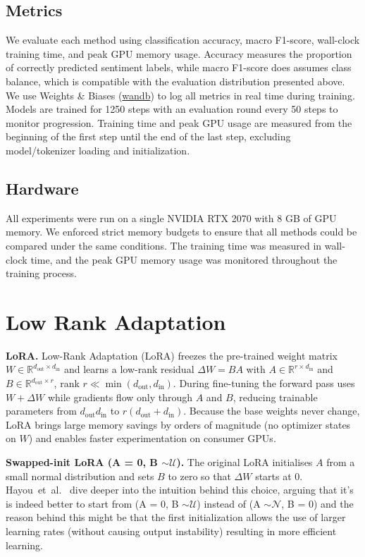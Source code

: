 \documentclass[a4paper,10pt,twocolumn,english]{article}
\begin{document}
\subsection{Metrics}
We evaluate each method using classification accuracy, macro F1-score, wall-clock training time, and peak GPU memory usage. Accuracy measures the proportion of correctly predicted sentiment labels, while macro F1-score does assumes class balance, which is compatible with the evaluation distribution presented above. We use Weights \& Biases (\href{https://wandb.ai/site/}{wandb}) to log all metrics in real time during training. Models are trained for 1250 steps with an evaluation round every 50 steps to monitor progression. Training time and peak GPU usage are measured from the beginning of the first step until the end of the last step, excluding model/tokenizer loading and initialization.


\subsection{Hardware} All experiments were run on a single NVIDIA RTX 2070 with 8 GB of GPU memory. We enforced strict memory budgets to ensure that all methods could be compared under the same conditions. The training time was measured in wall-clock time, and the peak GPU memory usage was monitored throughout the training process.

\section{Low Rank Adaptation}

\noindent\textbf{LoRA.}  Low-Rank Adaptation (LoRA) \cite{hu2021loralowrankadaptationlarge} freezes the pre-trained weight matrix $W\!\in\!\mathbb{R}^{d_{\text{out}}\times d_{\text{in}}}$ and learns a low-rank residual $\Delta W = B A$ with $A\!\in\!\mathbb{R}^{r \times d_{\text{in}}}$ and $B\!\in\!\mathbb{R} ^ {d_{\text{out}} \times r}$, rank $r\!\ll\!\min(d_{\text{out}},d_{\text{in}})$.  During fine-tuning the forward pass uses $W+\Delta W$ while gradients flow only through $A$ and $B$, reducing trainable parameters from $d_{\text{out}}d_{\text{in}}$ to $r(d_{\text{out}}+d_{\text{in}})$.  Because the base weights never change, LoRA brings large memory savings by orders of magnitude (no optimizer states on $W$) and enables faster experimentation on consumer GPUs.

\noindent\textbf{Swapped-init LoRA (A = 0, B $\sim\mathcal{U}$).}  The original LoRA initialises $A$ from a small normal distribution and sets $B$ to zero so that $\Delta W$ starts at 0.  Hayou~et~al.\ \cite{hayou2024impactinitializationlorafinetuning} dive deeper into the intuition behind this choice, arguing that it's is indeed better to start from (A = 0, B $\sim\mathcal{U}$) instead of (A $\sim\mathcal{N}$, B = 0) and the reason behind this might be that the first initialization allows the use of larger learning rates (without causing output instability) resulting in more efficient learning.
\end{document}
